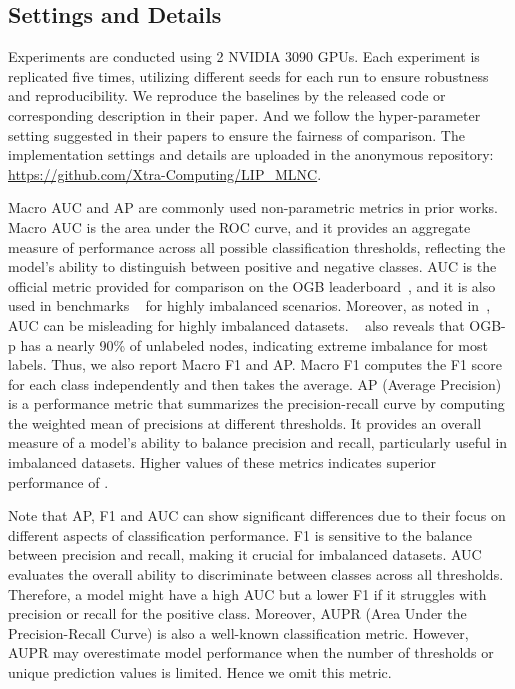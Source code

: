 \subsection{Settings and Details} \label{app:repro} \label{app:settings}
Experiments are conducted using 2 NVIDIA 3090 GPUs. Each experiment is replicated five times, utilizing different seeds for each run to ensure robustness and reproducibility. 
We reproduce the baselines by the released code or corresponding description in their paper. And we follow the hyper-parameter setting suggested in their papers to ensure the fairness of comparison.
The implementation settings and details are uploaded in the anonymous repository: \url{https://github.com/Xtra-Computing/LIP_MLNC}. 


Macro AUC and AP are commonly used non-parametric metrics in prior works. 
Macro AUC is the area under the ROC curve, and it provides an aggregate measure of performance across all possible classification thresholds, reflecting the model's ability to distinguish between positive and negative classes. 
AUC is the official metric provided for comparison on the OGB leaderboard~\citep{hu2020open}, and it is also used in benchmarks ~\citep{tang2023gadbench} for highly imbalanced scenarios.
Moreover, as noted in~\citep{zhao2023multi,yang2015evaluating,sun2025handling,sun2024fine}, AUC can be misleading for highly imbalanced datasets. 
~\citep{zhao2023multi} also reveals that OGB-p has a nearly 90\% of unlabeled nodes, indicating extreme imbalance for most labels. 
Thus, we also report Macro F1 and AP.
Macro F1 computes the F1 score for each class independently and then takes the average. 
AP (Average Precision) is a performance metric that summarizes the precision-recall curve by computing the weighted mean of precisions at different thresholds. It provides an overall measure of a model’s ability to balance precision and recall, particularly useful in imbalanced datasets.
Higher values of these metrics indicates superior performance of \model.

Note that AP, F1 and AUC can show significant differences due to their focus on different aspects of classification performance. F1 is sensitive to the balance between precision and recall, making it crucial for imbalanced datasets. AUC evaluates the overall ability to discriminate between classes across all thresholds. Therefore, a model might have a high AUC but a lower F1 if it struggles with precision or recall for the positive class. 
Moreover, AUPR (Area Under the Precision-Recall Curve) is also a well-known classification metric. However, AUPR may overestimate model performance when the number of thresholds or unique prediction values is limited. Hence we omit this metric.

